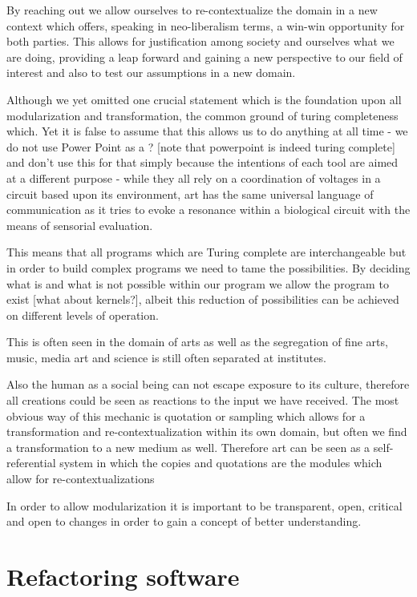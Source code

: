 \documentclass[10pt,twocolumn,letterpaper]{article}
\begin{document}
By reaching out we allow ourselves to re-contextualize the domain in a new context which offers, speaking in neo-liberalism terms, a win-win opportunity for both parties.
This allows for justification among society and ourselves what we are doing, providing a leap forward and gaining a new perspective to our field of interest and also to test our assumptions in a new domain.

Although we yet omitted one crucial statement which is the foundation upon all modularization and transformation, the common ground of turing completeness which.
Yet it is false to assume that this allows us to do anything at all time - we do not use Power Point as a ? [note that powerpoint is indeed turing complete] and don't use this for that simply because the intentions of each tool are aimed at a different purpose  - while they all rely on a coordination of voltages in a circuit based upon its environment, art has the same universal language of communication as it tries to evoke a resonance within a biological circuit with the means of sensorial evaluation.

This means that all programs which are Turing complete are interchangeable but in order to build complex programs we need to tame the possibilities.
By deciding what is and what is not possible within our program we allow the program to exist [what about kernels?], albeit this reduction of possibilities can be achieved on different levels of operation.

This is often seen in the domain of arts as well as the segregation of fine arts, music, media art and science is still often separated at institutes.

Also the human as a social being can not escape exposure to its culture, therefore all creations could be seen as reactions to the input we have received.
The most obvious way of this mechanic is quotation or sampling which allows for a transformation and re-contextualization within its own domain, but often we find a transformation to a new medium as well.
Therefore art can be seen as a self-referential system in which the copies and quotations are the modules which allow for re-contextualizations 

In order to allow modularization it is important to be transparent, open, critical and open to changes in order to gain a concept of better understanding.

\section{Refactoring software}
\end{document}

